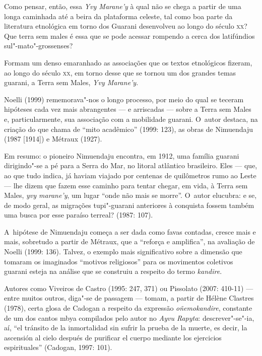 Como pensar, então, essa \emph{Yvy Marane’y} à qual não se chega a partir de
uma longa caminhada até a beira da plataforma celeste, tal como boa
parte da literatura etnológica em torno dos Guarani desenvolveu ao
longo do século \textsc{xx}? Que terra sem males é essa que se pode acessar
rompendo a cerca dos latifúndios sul"-mato"-grossenses?

Formam um denso emaranhado as associações que os textos etnológicos
fizeram, ao longo do século \textsc{xx}, em torno desse que se tornou um dos
grandes temas guarani, a Terra sem Males, \emph{Yvy Marane’y}.

Noelli (1999) rememorava"-nos o longo processo, por meio do qual se
teceram hipóteses cada vez mais abrangentes --- e arriscadas --- sobre a
Terra sem Males e, particularmente, sua associação com a mobilidade
guarani. O~autor destaca, na criação do que chama de ``mito acadêmico''
(1999: 123), as obras de Nimuendaju (1987 [1914]) e Métraux (1927).

Em resumo: o pioneiro Nimuendaju encontra, em 1912, uma família guarani
dirigindo"-se a pé para a Serra do Mar, no litoral atlântico brasileiro.
Eles --- que, ao que tudo indica, já haviam viajado por centenas de
quilômetros rumo ao Leste --- lhe dizem que fazem esse caminho para
tentar chegar, em vida, à Terra sem Males, \emph{yvy marane’y}, um lugar ``onde
não mais se morre''. O~autor elucubra: e se, de modo geral, as migrações
tupi"-guarani anteriores à conquista fossem também uma busca por esse
paraíso terreal? (1987: 107).

A~hipótese de Nimuendaju começa a ser dada como favas contadas, cresce
mais e mais, sobretudo a partir de Métraux, que a ``reforça e
amplifica'', na avaliação de Noelli (1999: 136). Talvez, o exemplo mais
significativo sobre a dimensão que tomaram os imaginados ``motivos
religiosos'' para os movimentos coletivos guarani esteja na análise que
se construiu a respeito do termo \emph{kandire}.

Autores como Viveiros de Castro (1995: 247, 371) ou Pissolato (2007:
410-11) --- entre muitos outros, diga"-se de passagem --- tomam, a partir de
Hélène Clastres (1978), certa glosa de Cadogan a respeito da expressão
\emph{oñemokandire}, constante de um dos cantos mbya compilados pelo autor no
\emph{Ayvu Rapyta}: descrever"-se"-ia, aí, ``el tránsito de la inmortalidad sin
sufrir la prueba de la muerte, es decir, la ascensión al cielo después
de purificar el cuerpo mediante los ejercicios espirituales'' (Cadogan,
1997: 101). 

